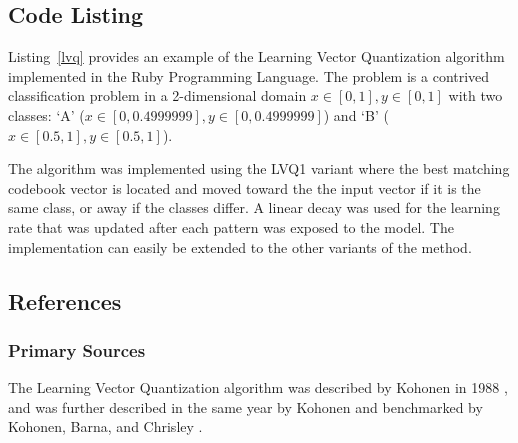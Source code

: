 \subsection{Code Listing}
Listing~\ref{lvq} provides an example of the Learning Vector Quantization algorithm implemented in the Ruby Programming Language. 
The problem is a contrived classification problem in a 2-dimensional domain $x\in[0,1], y\in[0,1]$ with two classes: `A' ($x\in[0,0.4999999], y\in[0,0.4999999]$) and `B' ($x\in[0.5,1], y\in[0.5,1]$).

The algorithm was implemented using the LVQ1 variant where the best matching codebook vector is located and moved toward the the input vector if it is the same class, or away if the classes differ. A linear decay was used for the learning rate that was updated after each pattern was exposed to the model. The implementation can easily be extended to the other variants of the method.



\subsection{References}

% 
% 
\subsubsection{Primary Sources}
The Learning Vector Quantization algorithm was described by Kohonen in 1988 \cite{Kohonen1988}, and was further described in the same year by Kohonen \cite{Kohonen1988a} and benchmarked by Kohonen, Barna, and Chrisley \cite{Kohonen1988b}.

